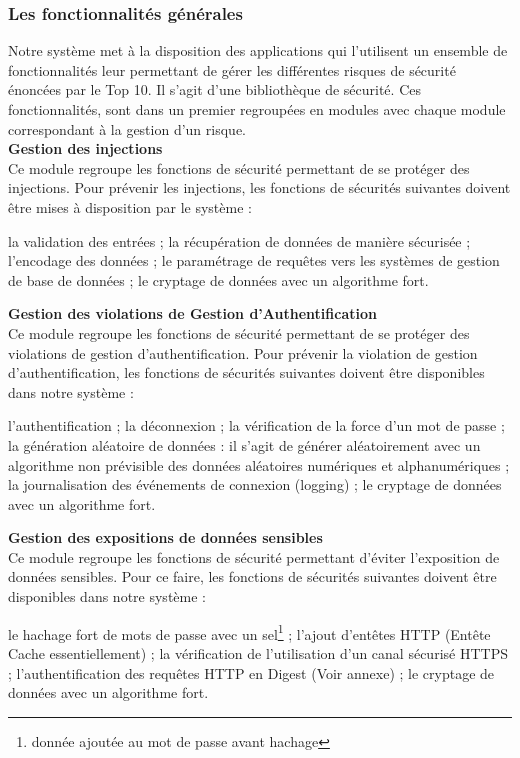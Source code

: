 \subsubsection{Les fonctionnalités générales}
Notre système met à la disposition des applications qui l'utilisent un ensemble de fonctionnalités leur permettant de gérer les différentes risques de sécurité énoncées par le Top 10. Il s'agit d'une bibliothèque de sécurité. Ces fonctionnalités, sont dans un premier regroupées en modules avec chaque module correspondant à la gestion d'un risque.\\

\textbf{\RIGHTarrow Gestion des injections}\\
Ce module regroupe les fonctions de sécurité permettant de se protéger des injections. Pour prévenir les injections, les fonctions de sécurités suivantes doivent être mises à disposition par le système : 
\begin{itemize}
	\itemcheck la validation des entrées ; 
	\itemcheck la récupération de données de manière sécurisée ; 
	\itemcheck l’encodage des données ; 
	\itemcheck le paramétrage de requêtes vers les systèmes de gestion de base de données ; 
	\itemcheck le cryptage de données avec un algorithme fort.\\
\end{itemize}

\textbf{\RIGHTarrow Gestion des violations de Gestion d’Authentification}\\
Ce module regroupe les fonctions de sécurité permettant de se protéger des violations de gestion d'authentification. Pour prévenir la violation de gestion d'authentification, les fonctions de sécurités suivantes doivent être disponibles dans notre système :
 \begin{itemize}
 	\itemcheck l'authentification ;
 	\itemcheck la déconnexion ;
 	\itemcheck la vérification de la force d'un mot de passe ; 
 	\itemcheck la génération aléatoire de données : il s'agit de générer aléatoirement avec un algorithme non prévisible des données aléatoires numériques et alphanumériques ; 
 	\itemcheck la journalisation des événements de connexion (logging) ; 
 	\itemcheck le cryptage de données avec un algorithme fort.\\
 \end{itemize}

\textbf{\RIGHTarrow Gestion des expositions de données sensibles}\\
Ce module regroupe les fonctions de sécurité permettant d'éviter l'exposition de données sensibles. Pour ce faire, les fonctions de sécurités suivantes doivent être disponibles dans notre système :
\begin{itemize}
	\itemcheck le hachage fort de mots de passe avec un sel\footnote{donnée ajoutée au mot de passe avant hachage} ;
	\itemcheck l'ajout d'entêtes HTTP (Entête Cache essentiellement) ;
	\itemcheck la vérification de l'utilisation d'un canal sécurisé HTTPS ;
	\itemcheck l'authentification des requêtes HTTP en Digest (Voir annexe) ;
	\itemcheck le cryptage de données avec un algorithme fort.\\
\end{itemize}

